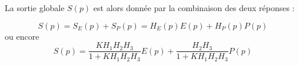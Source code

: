 \question{}
La sortie globale $S(p)$ est alors donnée par la combinaison des deux réponses :

\[
    S(p)=S_E(p)+S_P(p)=H_E(p)E(p) + H_P(p)P(p)
\]
ou encore
\[
    S(p)=\dfrac{KH_1H_2H_3}{1+KH_1H_2H_3}E(p)+\dfrac{H_2H_3}{1+KH_1H_2H_3} P(p)
\]



